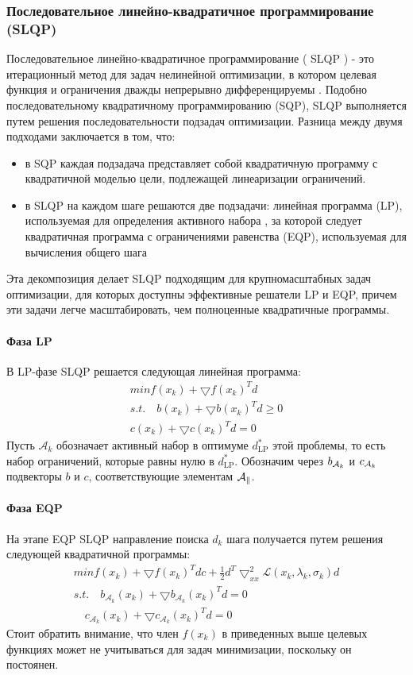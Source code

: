 \documentclass[12pt,a4paper]{article}
\begin{document}
	\subsubsection{Последовательное линейно-квадратичное программирование (SLQP)}
Последовательное линейно-квадратичное программирование ( SLQP ) - это итерационный метод для задач нелинейной оптимизации, в котором целевая функция и ограничения дважды непрерывно дифференцируемы . Подобно последовательному квадратичному программированию (SQP), SLQP выполняется путем решения последовательности подзадач оптимизации. Разница между двумя подходами заключается в том, что:
\begin{itemize}
	\item в SQP каждая подзадача представляет собой квадратичную программу с квадратичной моделью цели, подлежащей линеаризации ограничений.
	\item в SLQP на каждом шаге решаются две подзадачи: линейная программа (LP), используемая для определения активного набора , за которой следует квадратичная программа с ограничениями равенства (EQP), используемая для вычисления общего шага
\end{itemize}

Эта декомпозиция делает SLQP подходящим для крупномасштабных задач оптимизации, для которых доступны эффективные решатели LP и EQP, причем эти задачи легче масштабировать, чем полноценные квадратичные программы.\\
\vspace{\baselineskip}
\paragraph{Фаза LP}
В LP-фазе SLQP решается следующая линейная программа:
\begin{align*}
	min f(x_k) + \bigtriangledown f(x_k)^Td \\
	s.t. \quad b(x_k) + \bigtriangledown b(x_k)^Td \geq 0 \\
	c(x_k) + \bigtriangledown c(x_k)^Td=0
\end{align*}
Пусть $\mathcal{A}_{k}$ обозначает активный набор в оптимуме $ d_{\text{LP}}^{*}$ этой проблемы, то есть набор ограничений, которые равны нулю в $d_{\text{LP}}^{*}$. Обозначим через $b_{{\cal{A}}_{k}}$ и $c_{{\cal{A}}_{k}}$ подвекторы $b$ и $c$, соответствующие элементам $\cal{A}_{k}$.

\paragraph{Фаза EQP}
На этапе EQP SLQP направление поиска $d_{k}$ шага получается путем решения следующей квадратичной программы:
\begin{align*}
	min f(x_k) + \bigtriangledown f(x_k)^Tdc+ \frac{1}{2}d^T \bigtriangledown_{xx}^{2}{\mathcal{L}}(x_k, \lambda_k, \sigma_k)d\\
	s.t. \quad b_{\mathcal{A}_k}(x_k) + \bigtriangledown  b_{\mathcal{A}_k}(x_k)^Td = 0\\
	  \quad c_{\mathcal{A}_k}(x_k) + \bigtriangledown  c_{\mathcal{A}_k}(x_k)^Td=0
\end{align*}
Стоит обратить внимание, что член $f(x_{k})$ в приведенных выше целевых функциях может не учитываться для задач минимизации, поскольку он постоянен.
\end{document}
